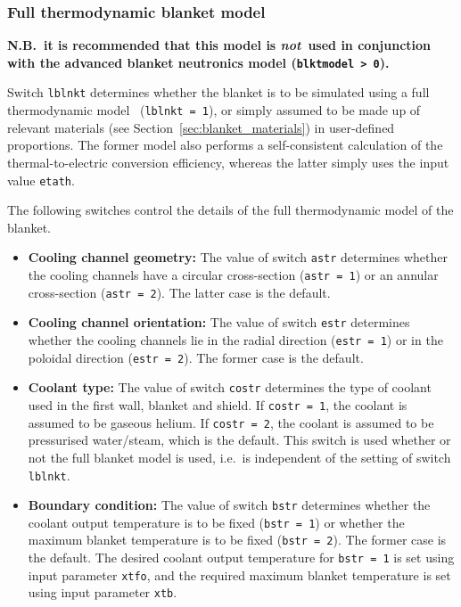 \documentclass[11pt,a4paper]{report}
\begin{document}
\subsubsection{Full thermodynamic blanket model}
\label{sec:blanket}


\textbf{N.B.\ it is recommended that this model is \textit{not}\ used in
  conjunction with the advanced blanket neutronics model (\texttt{blktmodel >
    0}).}

Switch \texttt{lblnkt} determines whether the blanket is to be simulated using
a full thermodynamic model~\cite{Panos} (\texttt{lblnkt = 1}), or simply
assumed to be made up of relevant materials (see
Section~\ref{sec:blanket_materials}) in user-defined proportions. The former
model also performs a self-consistent calculation of the thermal-to-electric
conversion efficiency, whereas the latter simply uses the input value
\texttt{etath}.

The following switches control the details of the full thermodynamic model of
the blanket.

\begin{itemize}

\item \textbf{Cooling channel geometry:} The value of switch \texttt{astr}
  determines whether the cooling channels have a circular cross-section
  (\texttt{astr = 1}) or an annular cross-section (\texttt{astr = 2}). The
  latter case is the default.

\item \textbf{Cooling channel orientation:} The value of switch \texttt{estr}
  determines whether the cooling channels lie in the radial direction
  (\texttt{estr = 1}) or in the poloidal direction (\texttt{estr = 2}). The
  former case is the default.

\item \textbf{Coolant type:} The value of switch \texttt{costr} determines the
  type of coolant used in the first wall, blanket and shield. If \texttt{costr
    = 1}, the coolant is assumed to be gaseous helium. If \texttt{costr = 2},
  the coolant is assumed to be pressurised water/steam, which is the
  default. This switch is used whether or not the full blanket model is used,
  i.e.\ is independent of the setting of switch \texttt{lblnkt}.

\item \textbf{Boundary condition:} The value of switch \texttt{bstr}
  determines whether the coolant output temperature is to be fixed
  (\texttt{bstr = 1}) or whether the maximum blanket temperature is to be
  fixed (\texttt{bstr = 2}). The former case is the default.  The desired
  coolant output temperature for \texttt{bstr = 1} is set using input
  parameter \texttt{xtfo}, and the required maximum blanket temperature is set
  using input parameter \texttt{xtb}.

\end{itemize}
\end{document}
